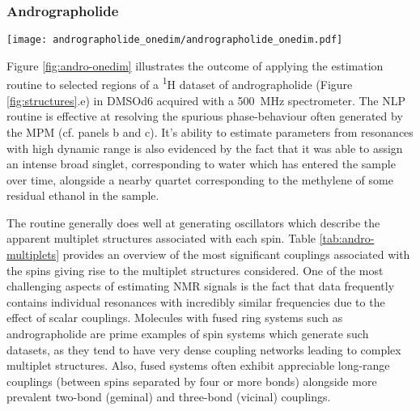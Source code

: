 \subsubsection{Andrographolide}
\begin{sidewaysfigure}
    \centering
    \texttt{[image: andrographolide\_onedim/andrographolide\_onedim.pdf]}
    \caption[
        Result of applying the estimation routine to selected regions of a
        pulse-acquire dataset of andrographolide.
    ]{
        Result of applying the estimation routine to selected regions of a
        pulse-acquire dataset of andrographolide in \acs{DMSOd6}.
        \textbf{a.} Spectral data corresponding to the regions considered.
        \textbf{b.} The result of applying the \acs{MPM} to the regions, with
        the model order predicted with the \acs{MDL}. Blue/red lines: peaks of
        individual oscillators, grey line above: the model (sum of all
        oscillators), grep line below: the residual between the data and the model.
        \textbf{c.} The result after convergence of the \acs{NLP} routine, again
        with the model above and residual below.
        Red peaks in panel b correspond to oscillators which acquire negative
        amplitudes during the \acs{NLP} routine, and are subsequently purged.
        Note that one of the reasons estimated has been split in two in the
        figure to save space, with one half, featuring a signal from ethanol,
        being magnified.
    }
    \label{fig:andro-onedim}
\end{sidewaysfigure}
Figure \ref{fig:andro-onedim} illustrates the outcome of applying the
estimation routine to selected regions of a \textsuperscript{1}H dataset of
andrographolide (Figure \ref{fig:structures}.e) in \acs{DMSOd6} acquired with
a \qty{500}{\mega\hertz} spectrometer. The \ac{NLP}
routine is effective at resolving the spurious phase-behaviour often generated
by the \ac{MPM} (cf. panels b and c).
It's ability to estimate parameters from resonances with high
dynamic range is also evidenced by the fact that it was able to assign an
intense broad singlet, corresponding to water which has entered the sample
over time, alongside a nearby quartet corresponding to the methylene of some
residual ethanol in the sample.

The routine generally does well at generating oscillators which describe the
apparent multiplet structures associated with each spin. Table
\ref{tab:andro-multiplets} provides an overview of the most significant
couplings associated with the spins giving rise to the multiplet structures
considered.
One of the most challenging aspects of estimating \ac{NMR} signals is
the fact that data frequently contains individual resonances with incredibly
similar frequencies due to the effect of scalar couplings. Molecules
with fused ring systems such as andrographolide are prime examples of spin
systems which generate such datasets, as they tend to have very dense coupling
networks leading to complex multiplet structures. Also, fused systems often
exhibit appreciable long-range couplings (between spins separated by four or more bonds) alongside more prevalent two-bond (geminal) and three-bond (vicinal) couplings.

